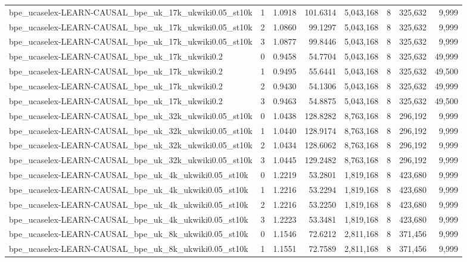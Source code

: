 \begin{tabular}{lrrrrrrr}
bpe\_ucaselex-LEARN-CAUSAL\_bpe\_uk\_17k\_ukwiki0.05\_st10k & 1 & 1.0918 & 101.6314 & 5,043,168 & 8 & 325,632 & 9,999 \\
bpe\_ucaselex-LEARN-CAUSAL\_bpe\_uk\_17k\_ukwiki0.05\_st10k & 2 & 1.0860 & 99.1297 & 5,043,168 & 8 & 325,632 & 9,999 \\
bpe\_ucaselex-LEARN-CAUSAL\_bpe\_uk\_17k\_ukwiki0.05\_st10k & 3 & 1.0877 & 99.8446 & 5,043,168 & 8 & 325,632 & 9,999 \\
bpe\_ucaselex-LEARN-CAUSAL\_bpe\_uk\_17k\_ukwiki0.2 & 0 & 0.9458 & 54.7704 & 5,043,168 & 8 & 325,632 & 49,999 \\
bpe\_ucaselex-LEARN-CAUSAL\_bpe\_uk\_17k\_ukwiki0.2 & 1 & 0.9495 & 55.6441 & 5,043,168 & 8 & 325,632 & 49,500 \\
bpe\_ucaselex-LEARN-CAUSAL\_bpe\_uk\_17k\_ukwiki0.2 & 2 & 0.9430 & 54.1306 & 5,043,168 & 8 & 325,632 & 49,999 \\
bpe\_ucaselex-LEARN-CAUSAL\_bpe\_uk\_17k\_ukwiki0.2 & 3 & 0.9463 & 54.8875 & 5,043,168 & 8 & 325,632 & 49,500 \\
bpe\_ucaselex-LEARN-CAUSAL\_bpe\_uk\_32k\_ukwiki0.05\_st10k & 0 & 1.0438 & 128.8282 & 8,763,168 & 8 & 296,192 & 9,999 \\
bpe\_ucaselex-LEARN-CAUSAL\_bpe\_uk\_32k\_ukwiki0.05\_st10k & 1 & 1.0440 & 128.9174 & 8,763,168 & 8 & 296,192 & 9,999 \\
bpe\_ucaselex-LEARN-CAUSAL\_bpe\_uk\_32k\_ukwiki0.05\_st10k & 2 & 1.0434 & 128.6062 & 8,763,168 & 8 & 296,192 & 9,999 \\
bpe\_ucaselex-LEARN-CAUSAL\_bpe\_uk\_32k\_ukwiki0.05\_st10k & 3 & 1.0445 & 129.2482 & 8,763,168 & 8 & 296,192 & 9,999 \\
bpe\_ucaselex-LEARN-CAUSAL\_bpe\_uk\_4k\_ukwiki0.05\_st10k & 0 & 1.2219 & 53.2801 & 1,819,168 & 8 & 423,680 & 9,999 \\
bpe\_ucaselex-LEARN-CAUSAL\_bpe\_uk\_4k\_ukwiki0.05\_st10k & 1 & 1.2216 & 53.2294 & 1,819,168 & 8 & 423,680 & 9,999 \\
bpe\_ucaselex-LEARN-CAUSAL\_bpe\_uk\_4k\_ukwiki0.05\_st10k & 2 & 1.2216 & 53.2250 & 1,819,168 & 8 & 423,680 & 9,999 \\
bpe\_ucaselex-LEARN-CAUSAL\_bpe\_uk\_4k\_ukwiki0.05\_st10k & 3 & 1.2223 & 53.3481 & 1,819,168 & 8 & 423,680 & 9,999 \\
bpe\_ucaselex-LEARN-CAUSAL\_bpe\_uk\_8k\_ukwiki0.05\_st10k & 0 & 1.1546 & 72.6212 & 2,811,168 & 8 & 371,456 & 9,999 \\
bpe\_ucaselex-LEARN-CAUSAL\_bpe\_uk\_8k\_ukwiki0.05\_st10k & 1 & 1.1551 & 72.7589 & 2,811,168 & 8 & 371,456 & 9,999 \\

\end{tabular}
